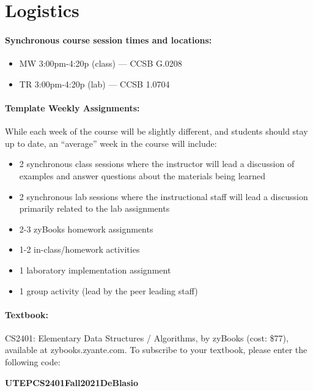 \documentclass[12pt]{scrartcl}
\begin{document}
\clearpage
\tableofcontents

\section{Logistics}
\paragraph{Synchronous course session times and locations:}
\begin{itemize}
\item MW 3:00pm-4:20p (class) --- CCSB G.0208
\item TR 3:00pm-4:20p (lab) --- CCSB 1.0704
\end{itemize}

\paragraph{Template Weekly Assignments:} While each week of the course will be slightly different, and students should stay up to date, an ``average'' week in the course will include:
\begin{itemize}
\item 2 synchronous class sessions where the instructor will lead a discussion of examples and answer questions about the materials being learned
\item 2 synchronous lab sessions where the  instructional staff will lead a discussion primarily related to the lab assignments
\item 2-3 zyBooks homework assignments
\item 1-2 in-class/homework activities
\item 1 laboratory implementation assignment
\item 1 group activity (lead by the peer leading staff) 
\end{itemize}

\paragraph{Textbook:} CS2401: Elementary Data Structures / Algorithms, by zyBooks (cost: \$77), available at zybooks.zyante.com. To subscribe to your textbook, please enter the following code: 
\begin{center}
\textbf{\Large UTEPCS2401Fall2021DeBlasio}
\end{center}
\end{document}
